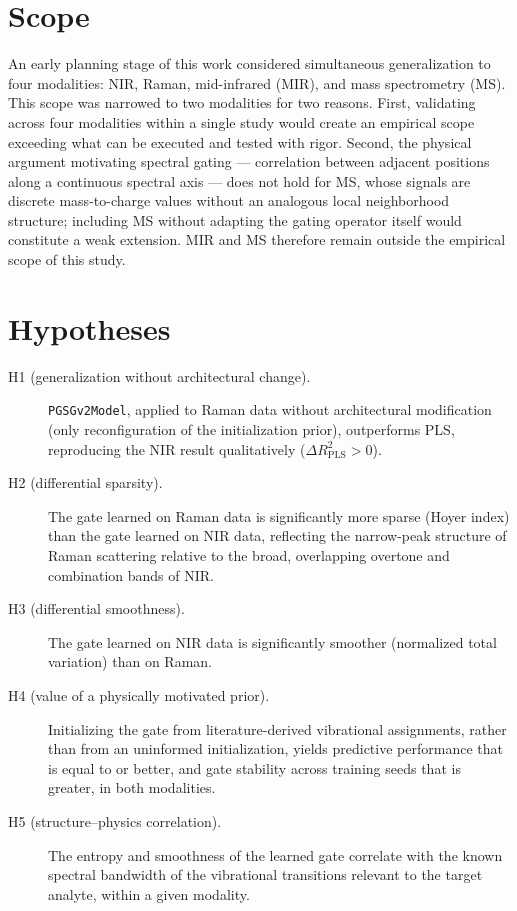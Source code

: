 \documentclass[preprint,12pt]{elsarticle}
\begin{document}
\section{Scope}
\label{sec:scope}

An early planning stage of this work considered simultaneous generalization to four modalities: NIR, Raman, mid-infrared (MIR), and mass spectrometry (MS). This scope was narrowed to two modalities for two reasons. First, validating across four modalities within a single study would create an empirical scope exceeding what can be executed and tested with rigor. Second, the physical argument motivating spectral gating --- correlation between adjacent positions along a continuous spectral axis --- does not hold for MS, whose signals are discrete mass-to-charge values without an analogous local neighborhood structure; including MS without adapting the gating operator itself would constitute a weak extension. MIR and MS therefore remain outside the empirical scope of this study.

\section{Hypotheses}
\label{sec:hypotheses}

\begin{description}
\item[H1 (generalization without architectural change).] \texttt{PGSGv2Model}, applied to Raman data without architectural modification (only reconfiguration of the initialization prior), outperforms PLS, reproducing the NIR result qualitatively ($\Delta R^{2}_{\mathrm{PLS}}>0$).
\item[H2 (differential sparsity).] The gate learned on Raman data is significantly more sparse (Hoyer index) than the gate learned on NIR data, reflecting the narrow-peak structure of Raman scattering relative to the broad, overlapping overtone and combination bands of NIR.
\item[H3 (differential smoothness).] The gate learned on NIR data is significantly smoother (normalized total variation) than on Raman.
\item[H4 (value of a physically motivated prior).] Initializing the gate from literature-derived vibrational assignments, rather than from an uninformed initialization, yields predictive performance that is equal to or better, and gate stability across training seeds that is greater, in both modalities.
\item[H5 (structure--physics correlation).] The entropy and smoothness of the learned gate correlate with the known spectral bandwidth of the vibrational transitions relevant to the target analyte, within a given modality.
\end{description}
\end{document}
